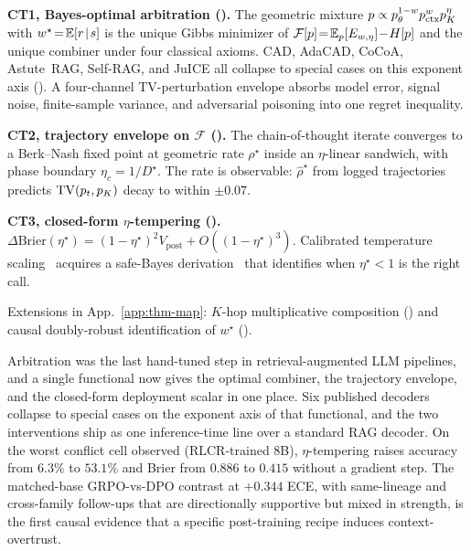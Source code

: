 \textbf{CT1, Bayes-optimal arbitration ().} The geometric mixture $p \propto p_\theta^{1-w}p_{\mathrm{ctx}}^{w}p_K^{\eta}$ with $w^\star\!=\!\mathbb{E}[r\!\mid\!s]$ is the unique Gibbs minimizer of $\mathcal{F}[p]\!=\!\mathbb{E}_p[E_{w,\eta}]\!-\!H[p]$ and the unique combiner under four classical axioms. CAD, AdaCAD, CoCoA, Astute~RAG, Self-RAG, and JuICE all collapse to special cases on this exponent axis (). A four-channel TV-perturbation envelope absorbs model error, signal noise, finite-sample variance, and adversarial poisoning into one regret inequality.

\textbf{CT2, trajectory envelope on $\mathcal{F}$ ().} The chain-of-thought iterate converges to a Berk--Nash fixed point at geometric rate $\rho^\star$ inside an $\eta$-linear sandwich, with phase boundary $\eta_c\!=\!1/D^\star$. The rate is observable: $\widehat\rho^\star$ from logged trajectories predicts $\operatorname{TV}(p_t,p_K)$ decay to within $\pm 0.07$.

\textbf{CT3, closed-form $\eta$-tempering ().} $\Delta\mathrm{Brier}(\eta^\star)\!=\!(1\!-\!\eta^\star)^{2}V_{\mathrm{post}}\!+\!O((1\!-\!\eta^\star)^{3})$. Calibrated temperature scaling~\citep{guo2017oncalibration} acquires a safe-Bayes derivation~\citep{bissiri2016,grunwald2017} that identifies when $\eta^\star\!<\!1$ is the right call.

Extensions in App.~\ref{app:thm-map}: $K$-hop multiplicative composition () and causal doubly-robust identification of $w^\star$ ().

Arbitration was the last hand-tuned step in retrieval-augmented LLM pipelines, and a single functional now gives the optimal combiner, the trajectory envelope, and the closed-form deployment scalar in one place. Six published decoders collapse to special cases on the exponent axis of that functional, and the two interventions ship as one inference-time line over a standard RAG decoder. On the worst conflict cell observed (RLCR-trained $8$B), $\eta$-tempering raises accuracy from $6.3\%$ to $53.1\%$ and Brier from $0.886$ to $0.415$ without a gradient step. The matched-base GRPO-vs-DPO contrast at $+0.344$ ECE, with same-lineage and cross-family follow-ups that are directionally supportive but mixed in strength, is the first causal evidence that a specific post-training recipe induces context-overtrust.
